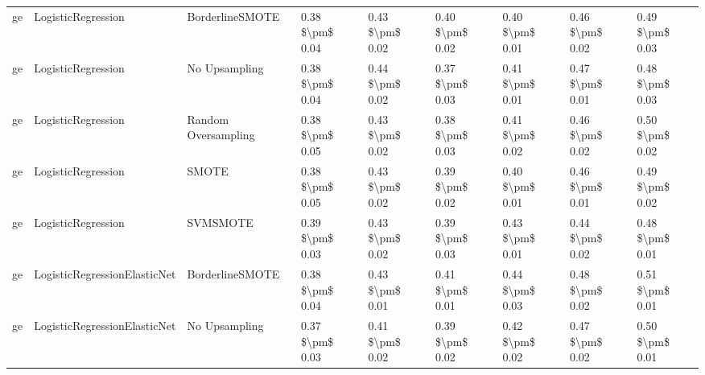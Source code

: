 \begin{tabular}{lllllllll}
      ge &              LogisticRegression &               BorderlineSMOTE & 0.38 \$\textbackslash pm\$ 0.04 &           0.43 \$\textbackslash pm\$ 0.02 &       0.40 \$\textbackslash pm\$ 0.02 &        0.40 \$\textbackslash pm\$ 0.01 &                         0.46 \$\textbackslash pm\$ 0.02 &     0.49 \$\textbackslash pm\$ 0.03 \\
      ge &              LogisticRegression &                 No Upsampling & 0.38 \$\textbackslash pm\$ 0.04 &           0.44 \$\textbackslash pm\$ 0.02 &       0.37 \$\textbackslash pm\$ 0.03 &        0.41 \$\textbackslash pm\$ 0.01 &                         0.47 \$\textbackslash pm\$ 0.01 &     0.48 \$\textbackslash pm\$ 0.03 \\
      ge &              LogisticRegression &           Random Oversampling & 0.38 \$\textbackslash pm\$ 0.05 &           0.43 \$\textbackslash pm\$ 0.02 &       0.38 \$\textbackslash pm\$ 0.03 &        0.41 \$\textbackslash pm\$ 0.02 &                         0.46 \$\textbackslash pm\$ 0.02 &     0.50 \$\textbackslash pm\$ 0.02 \\
      ge &              LogisticRegression &                         SMOTE & 0.38 \$\textbackslash pm\$ 0.05 &           0.43 \$\textbackslash pm\$ 0.02 &       0.39 \$\textbackslash pm\$ 0.02 &        0.40 \$\textbackslash pm\$ 0.01 &                         0.46 \$\textbackslash pm\$ 0.01 &     0.49 \$\textbackslash pm\$ 0.02 \\
      ge &              LogisticRegression &                      SVMSMOTE & 0.39 \$\textbackslash pm\$ 0.03 &           0.43 \$\textbackslash pm\$ 0.02 &       0.39 \$\textbackslash pm\$ 0.03 &        0.43 \$\textbackslash pm\$ 0.01 &                         0.44 \$\textbackslash pm\$ 0.02 &     0.48 \$\textbackslash pm\$ 0.01 \\
      ge &    LogisticRegressionElasticNet &               BorderlineSMOTE & 0.38 \$\textbackslash pm\$ 0.04 &           0.43 \$\textbackslash pm\$ 0.01 &       0.41 \$\textbackslash pm\$ 0.01 &        0.44 \$\textbackslash pm\$ 0.03 &                         0.48 \$\textbackslash pm\$ 0.02 &     0.51 \$\textbackslash pm\$ 0.01 \\
      ge &    LogisticRegressionElasticNet &                 No Upsampling & 0.37 \$\textbackslash pm\$ 0.03 &           0.41 \$\textbackslash pm\$ 0.02 &       0.39 \$\textbackslash pm\$ 0.02 &        0.42 \$\textbackslash pm\$ 0.02 &                         0.47 \$\textbackslash pm\$ 0.02 &     0.50 \$\textbackslash pm\$ 0.01 \\

\end{tabular}
